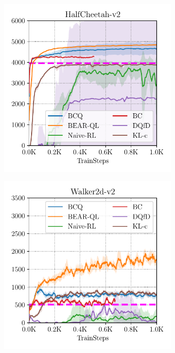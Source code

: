 \begin{figure}[t!]
    \centering
    \vspace{-0.05in}
    \begin{subfigure}[t]{0.23\textwidth}
        \centering
        \includegraphics[width=0.99\linewidth]{chapters/bear/images/images_camera_ready/cheetah_mediocre_camera_ready.pdf}
    \end{subfigure}
    \begin{subfigure}[t]{0.23\textwidth}
        \centering
        \includegraphics[width=0.99\linewidth]{chapters/bear/images/images_camera_ready/walker_mediocre_camera_ready.pdf}

\end{subfigure}
\end{figure}
